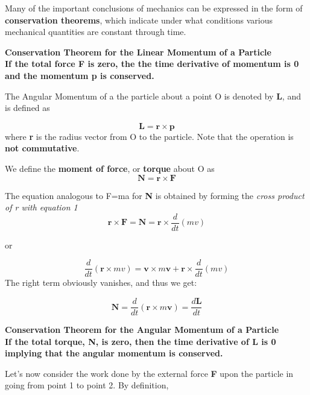 \documentclass{article}
\newcommand{\bb}[1]{\begin{tcolorbox}
  \textbf{#1}
\end{tcolorbox}}
\begin{document}
Many of the important conclusions of mechanics can be expressed in the form of \textbf{conservation theorems}, which indicate under what conditions various mechanical quantities are constant through time.

\bb{\textbf{Conservation Theorem for the Linear Momentum of a Particle}\\\newline If the total force \textbf{F} is zero, the the time derivative of momentum is 0 and the momentum \textbf{p} is conserved.}

The Angular Momentum of a the particle about a point O is denoted by \textbf{L}, and is defined as

\begin{equation*}
    \textbf{L} =\textbf{r}\times \textbf{p}
\end{equation*}
where \textbf{r} is the radius vector from O to the particle. Note that the operation is \textbf{not commutative}.

We define the \textbf{moment of force}, or \textbf{torque} about O as
\begin{equation*}
    \textbf{N} = \textbf{r} \times \textbf{F}
\end{equation*}

The equation analogous to F=ma for \textbf{N} is obtained by forming the \textit{cross product of r with equation 1}
\begin{equation}
    \textbf{r} \times \textbf{F} = \textbf{N} = \textbf{r} \times \frac{d}{dt}(mv)
\end{equation}


or 

\begin{equation*}
    \frac{d}{dt}(\textbf{r} \times mv) = \textbf{v} \times m\textbf{v} + \textbf{r}\times \frac{d}{dt}(mv)
\end{equation*}
The right term obviously vanishes, and thus we get:

\begin{equation}
    \textbf{N} = \frac{d}{dt}(\textbf{r}\times m\textbf{v}) = \frac{d\textbf{L}}{dt}
\end{equation}


\bb{\textbf{Conservation Theorem for the Angular Momentum of a Particle}\\\newline If the total torque, N, is zero, then the time derivative of L is 0 implying that the angular momentum is conserved.}

Let's now consider the work done by the external force \textbf{F} upon the particle in going from point 1 to point 2. By definition,
\end{document}
